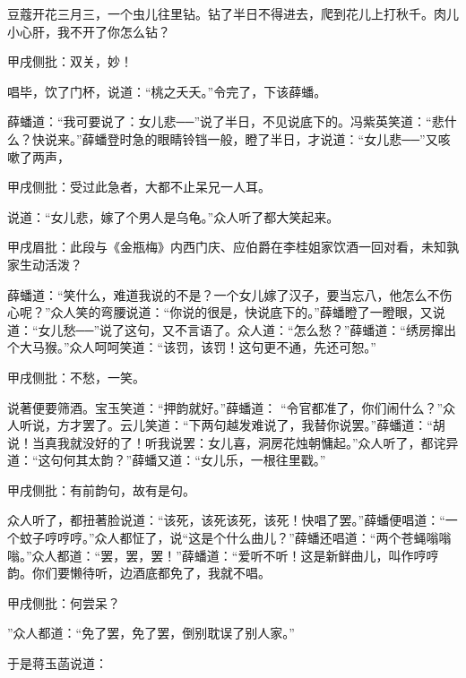 \begin{poem}
    \begin{pl}
        豆蔻开花三月三，一个虫儿往里钻。钻了半日不得进去，爬到花儿上打秋千。肉儿小心肝，我不开了你怎么钻？\end{pl}
    \begin{note}甲戌侧批：双关，妙！\end{note}
\end{poem}

\begin{parag}
    唱毕，饮了门杯，说道：“桃之夭夭。”令完了，下该薛蟠。
\end{parag}


\begin{parag}
    薛蟠道：“我可要说了：女儿悲──”说了半日，不见说底下的。冯紫英笑道：“悲什么？快说来。”薛蟠登时急的眼睛铃铛一般，瞪了半日，才说道：“女儿悲──”又咳嗽了两声，\begin{note}甲戌侧批：受过此急者，大都不止呆兄一人耳。\end{note}说道：“女儿悲，嫁了个男人是乌龟。”众人听了都大笑起来。\begin{note}甲戌眉批：此段与《金瓶梅》内西门庆、应伯爵在李桂姐家饮酒一回对看，未知孰家生动活泼？\end{note}薛蟠道：“笑什么，难道我说的不是？一个女儿嫁了汉子，要当忘八，他怎么不伤心呢？”众人笑的弯腰说道：“你说的很是，快说底下的。”薛蟠瞪了一瞪眼，又说道：“女儿愁──”说了这句，又不言语了。众人道：“怎么愁？”薛蟠道：“绣房撺出个大马猴。”众人呵呵笑道：“该罚，该罚！这句更不通，先还可恕。”\begin{note}甲戌侧批：不愁，一笑。\end{note}说著便要筛酒。宝玉笑道：“押韵就好。”薛蟠道： “令官都准了，你们闹什么？”众人听说，方才罢了。云儿笑道：“下两句越发难说了，我替你说罢。”薛蟠道：“胡说！当真我就没好的了！听我说罢：女儿喜，洞房花烛朝慵起。”众人听了，都诧异道：“这句何其太韵？”薛蟠又道：“女儿乐，一根往里戳。”\begin{note}甲戌侧批：有前韵句，故有是句。\end{note}众人听了，都扭著脸说道：“该死，该死该死，该死！快唱了罢。”薛蟠便唱道：“一个蚊子哼哼哼。”众人都怔了，说“这是个什么曲儿？”薛蟠还唱道：“两个苍蝇嗡嗡嗡。”众人都道：“罢，罢，罢！”薛蟠道：“爱听不听！这是新鲜曲儿，叫作哼哼韵。你们要懒待听，边酒底都免了，我就不唱。\begin{note}甲戌侧批：何尝呆？\end{note}”众人都道：“免了罢，免了罢，倒别耽误了别人家。”
\end{parag}


\begin{parag}
    于是蒋玉菡说道：
\end{parag}



